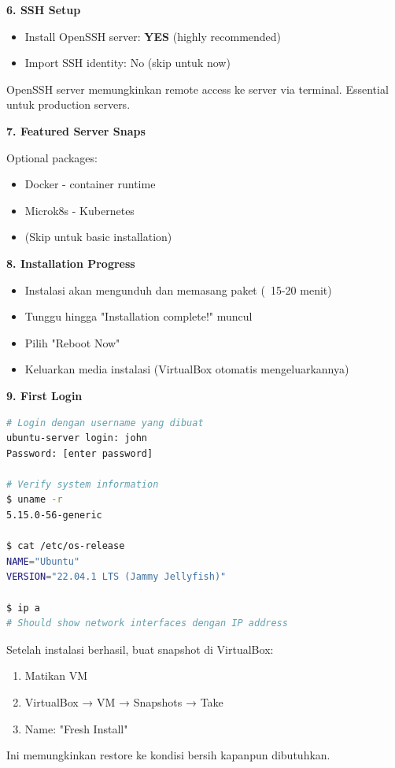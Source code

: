 \textbf{6. SSH Setup}

\begin{itemize}
    \item Install OpenSSH server: \textbf{YES} (highly recommended)
    \item Import SSH identity: No (skip untuk now)
\end{itemize}

\begin{notebox}
OpenSSH server memungkinkan remote access ke server via terminal. Essential untuk production servers.
\end{notebox}

\textbf{7. Featured Server Snaps}

Optional packages:
\begin{itemize}
    \item Docker - container runtime
    \item Microk8s - Kubernetes
    \item (Skip untuk basic installation)
\end{itemize}

\textbf{8. Installation Progress}

\begin{itemize}
    \item Instalasi akan mengunduh dan memasang paket (~15-20 menit)
    \item Tunggu hingga "Installation complete!" muncul
    \item Pilih "Reboot Now"
    \item Keluarkan media instalasi (VirtualBox otomatis mengeluarkannya)
\end{itemize}

\textbf{9. First Login}

\begin{lstlisting}[language=bash, caption={Login dan verify installation}]
# Login dengan username yang dibuat
ubuntu-server login: john
Password: [enter password]

# Verify system information
$ uname -r
5.15.0-56-generic

$ cat /etc/os-release
NAME="Ubuntu"
VERSION="22.04.1 LTS (Jammy Jellyfish)"

$ ip a
# Should show network interfaces dengan IP address
\end{lstlisting}

\begin{examplebox}[Snapshot VM]
Setelah instalasi berhasil, buat snapshot di VirtualBox:
\begin{enumerate}
    \item Matikan VM
    \item VirtualBox → VM → Snapshots → Take
    \item Name: "Fresh Install"
\end{enumerate}

Ini memungkinkan restore ke kondisi bersih kapanpun dibutuhkan.
\end{examplebox}


